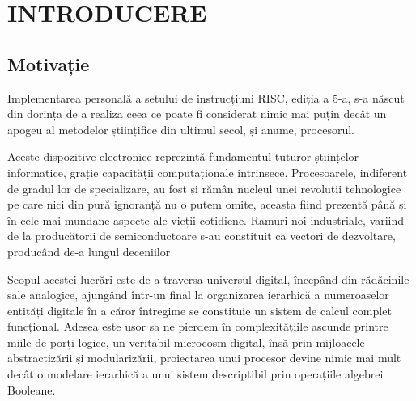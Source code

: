 \documentclass[12pt]{article}
\begin{document}
\section{\centering INTRODUCERE}


\subsection{Motivație}
Implementarea personală a setului de instrucțiuni RISC, ediția a 5-a, s-a născut din dorința de a realiza ceea ce poate fi considerat nimic mai puțin decât un apogeu al metodelor științifice din ultimul secol, și anume, procesorul.

Aceste dispozitive electronice reprezintă fundamentul tuturor științelor informatice, grație capacității computaționale intrinsece. Procesoarele, indiferent de gradul lor de specializare, au fost și rămân nucleul unei revoluții tehnologice pe care nici din pură ignoranță nu o putem omite, aceasta fiind prezentă până și în cele mai mundane aspecte ale vieții cotidiene. Ramuri noi industriale, variind de la producătorii de semiconductoare  s-au constituit ca vectori de dezvoltare, producând de-a lungul deceniilor 

Scopul acestei lucrări este de a traversa universul digital, începând din rădăcinile sale analogice, ajungând într-un final la organizarea ierarhică a numeroaselor entități digitale în a căror întregime se constituie un sistem de calcul complet funcțional. Adesea este usor sa ne pierdem în complexitățiile ascunde printre miile de porți logice, un veritabil microcosm digital, însă prin mijloacele abstractizării și modularizării, proiectarea unui procesor devine nimic mai mult decât o modelare ierarhică a unui sistem descriptibil prin operațiile algebrei Booleane.
\end{document}
